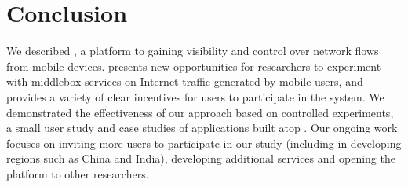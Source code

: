 \section{Conclusion}
\label{sec:conclusion}
We described \meddle, a platform to gaining visibility and control over 
network flows from mobile devices. \meddle presents new opportunities for researchers 
to experiment with middlebox services on Internet traffic generated by mobile users, and 
provides a variety of clear incentives for users to participate in the system. We demonstrated 
the effectiveness of our approach based on controlled experiments, a small user study and 
case studies of applications built atop \meddle. Our ongoing work focuses on inviting more 
users to participate in our study (including in developing regions such as China and India), 
developing additional \meddlebox services and opening 
the platform to other researchers. 

